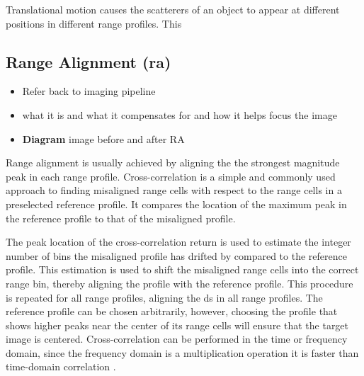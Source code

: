 \documentclass[class=report,11pt,crop=false]{standalone}
\begin{document}
Translational motion causes the scatterers of an object to appear at different positions in different range profiles. This 

    \subsection{Range Alignment (\gls{ra})}
    \begin{itemize}
        \item Refer back to imaging pipeline
        \item what it is and what it compensates for and how it helps focus the image
        \item \textbf{Diagram} image before and after RA
    \end{itemize}

    
    Range alignment is usually achieved by aligning the the strongest magnitude peak in each range profile. Cross-correlation is a simple and commonly used approach to finding misaligned range cells with respect to the range cells in a preselected reference profile. It compares the location of the maximum peak in the reference profile to that of the misaligned profile.
    
    The peak location of the cross-correlation return is used to estimate the integer number of bins the misaligned profile has drifted by compared to the reference profile. This estimation is used to shift the misaligned range cells into the correct range bin, thereby aligning the profile with the reference profile. This procedure is repeated for all range profiles, aligning the \gls{ds} in all range profiles. The reference profile can be chosen arbitrarily, however, choosing the profile that shows higher peaks near the center of its range cells will ensure that the target image is centered. Cross-correlation can be performed in the time or frequency domain, since the frequency domain is a multiplication operation it is faster than time-domain correlation \cite{ISARtextbook_Martorella}. %
\end{document}
